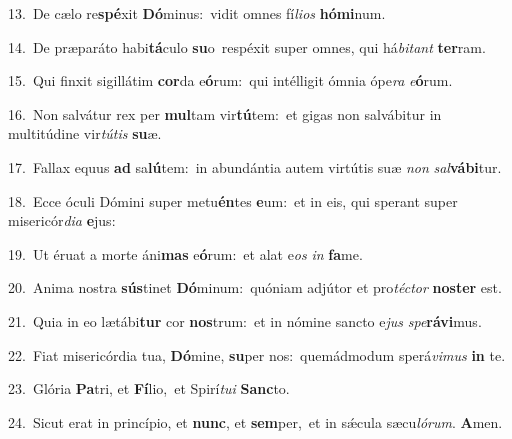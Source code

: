 {\numbfont\textcolor{\numbcolor}{13.}}~De cælo re\-\textbf{spé}\-xit \textbf{Dó}\-minus:~\star vidit omnes fí\-\textit{li}\-\textit{os} \textbf{hó}\-\textbf{mi}num.\par
{\numbfont\textcolor{\numbcolor}{14.}}~De præparáto habi\-\textbf{tá}\-culo \textbf{su}\-o~\star respéxit super omnes, qui há\-\textit{bi}\-\textit{tant} \textbf{ter}\-ram.\par
{\numbfont\textcolor{\numbcolor}{15.}}~Qui finxit sigillátim \textbf{cor}\-da e\-\textbf{ó}\-rum:~\star qui intélligit ómnia ópe\textit{ra} \textit{e}\-\textbf{ó}rum.\par
{\numbfont\textcolor{\numbcolor}{16.}}~Non salvátur rex per \textbf{mul}\-tam vir\-\textbf{tú}\-tem:~\star et gigas non salvábitur in multitúdine vir\-\textit{tú}\-\textit{tis} \textbf{su}\-æ.\par
{\numbfont\textcolor{\numbcolor}{17.}}~Fallax equus \textbf{ad} sa\-\textbf{lú}\-tem:~\star in abundántia autem virtútis suæ \textit{non} \textit{sal}\-\textbf{vá}\textbf{bi}tur.\par
{\numbfont\textcolor{\numbcolor}{18.}}~Ecce óculi Dómini super metu\-\textbf{én}\-tes \textbf{e}\-um:~\star et in eis, qui sperant super misericór\-\textit{di}\-\textit{a} \textbf{e}\-jus:\par
{\numbfont\textcolor{\numbcolor}{19.}}~Ut éruat a morte áni\textbf{mas} e\-\textbf{ó}\-rum:~\star et alat e\textit{os} \textit{in} \textbf{fa}\-me.\par
{\numbfont\textcolor{\numbcolor}{20.}}~Anima nostra \textbf{sús}\-tinet \textbf{Dó}\-minum:~\star quóniam adjútor et pro\-\textit{téc}\-\textit{tor} \textbf{nos}\-\textbf{ter} est.\par
{\numbfont\textcolor{\numbcolor}{21.}}~Quia in eo lætábi\textbf{tur} cor \textbf{nos}\-trum:~\star et in nómine sancto e\textit{jus} \textit{spe}\-\textbf{rá}\textbf{vi}mus.\par
{\numbfont\textcolor{\numbcolor}{22.}}~Fiat misericórdia tua, \textbf{Dó}\-mine, \textbf{su}\-per nos:~\star quemádmodum sperá\-\textit{vi}\-\textit{mus} \textbf{in} te.\par
{\numbfont\textcolor{\numbcolor}{23.}}~Glória \textbf{Pa}\-tri, et \textbf{Fí}\-lio,~\star et Spirí\-\textit{tu}\-\textit{i} \textbf{Sanc}\-to.\par
{\numbfont\textcolor{\numbcolor}{24.}}~Sicut erat in princípio, et \textbf{nunc}\-, et \textbf{sem}\-per,~\star et in sǽcula sæcu\-\textit{ló}\-\textit{rum}. \textbf{A}\-men.\par
